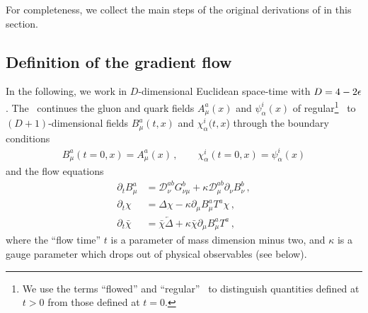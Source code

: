 \label{sec:pert}

For completeness, we collect the main steps of the original
derivations of  in this section.


\subsection{Definition of the gradient flow}

In the following, we work in $D$-dimensional Euclidean space-time
with $D=4-2\epsilon$.  The \gff\ continues the gluon and quark fields
$A^a_\mu(x)$ and $\psi_\alpha^i(x)$ of regular\footnote{We use the terms
  ``flowed'' and ``regular'' \qcd\ to distinguish quantities defined at
  $t>0$ from those defined at $t=0$.} \qcd\ to $(D+1)$-dimensional
fields $B^a_\mu(t,x)$ and $\chi_\alpha^i(t,x$) through the boundary
conditions
\begin{equation}
  \begin{split}
    B_\mu^a (t=0,x) = A_\mu^a (x)\,,\qquad \chi_\alpha^i (t=0,x)=
    \psi_\alpha^i(x)
    \label{eq:bound}
  \end{split}
\end{equation}
and the flow equations\,\cite{Luscher:2010iy,Luscher:2013cpa}
\begin{equation}
  \begin{split}
    \partial_t B_\mu^a &= \mathcal{D}^{ab}_\nu G_{\nu\mu}^b + \kappa
    \mathcal{D}^{ab}_\mu \partial_\nu B_\nu^b\,,\\ \partial_t \chi &= \Delta \chi
    - \kappa \partial_\mu B_\mu^a T^a \chi\,,\\ \partial_t \bar
    \chi &= \bar \chi \overleftarrow \Delta + \kappa \bar \chi
    \partial_\mu B_\mu^a T^a\,,
    \label{eq:flow}
  \end{split}
\end{equation}
where the ``flow time'' $t$ is a parameter of mass dimension minus two,
and $\kappa$ is a gauge parameter which drops out of physical
observables (see below).

